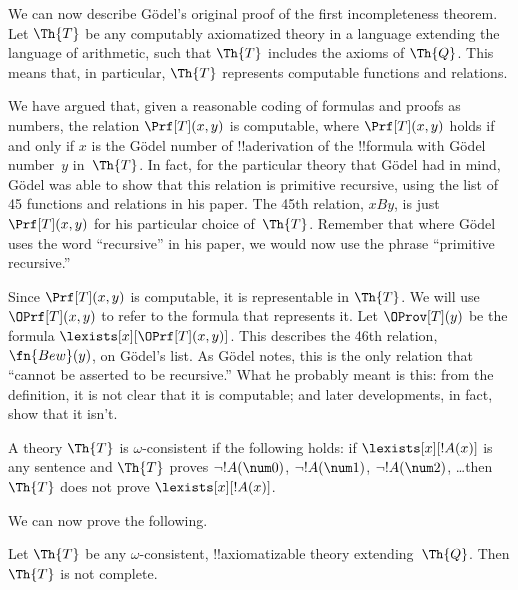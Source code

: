 \documentclass[../../../include/open-logic-section]{subfiles}
\begin{document}


We can now describe G\"odel's original proof of the first
incompleteness theorem. Let $\Th{T}$ be any computably axiomatized theory
in a language extending the language of arithmetic, such that $\Th{T}$
includes the axioms of $\Th{Q}$. This means that, in particular, $\Th{T}$
represents computable functions and relations.

We have argued that, given a reasonable coding of formulas and proofs
as numbers, the relation $\Prf[T](x,y)$ is computable, where
$\Prf[T](x,y)$ holds if and only if $x$ is the G\"odel number of
!!a{derivation} of the !!{formula} with G\"odel number~$y$
in~$\Th{T}$. In fact, for the particular theory that G\"odel had in
mind, G\"odel was able to show that this relation is primitive
recursive, using the list of 45 functions and relations in his
paper. The 45th relation, $x B y$, is just $\Prf[T](x,y)$ for his
particular choice of~$\Th{T}$. Remember that where G\"odel uses the
word ``recursive'' in his paper, we would now use the phrase
``primitive recursive.''

Since $\Prf[T](x,y)$ is computable, it is representable in $\Th{T}$. We
will use $\OPrf[T](x,y)$ to refer to the formula that represents
it. Let $\OProv[T](y)$ be the formula
$\lexists[x][\OPrf[T](x,y)]$. This describes the 46th relation,
$\fn{Bew}(y)$, on G\"odel's list. As G\"odel notes, this is the only
relation that ``cannot be asserted to be recursive.''  What he
probably meant is this: from the definition, it is not clear that it
is computable; and later developments, in fact, show that it isn't.

\begin{defn}
A theory $\Th{T}$ is $\omega$-consistent if the following holds: if
$\lexists[x][!A(x)]$ is any sentence and $\Th{T}$ proves $\lnot
!A(\num 0)$, $\lnot !A(\num 1)$, $\lnot !A(\num 2)$, \dots then $\Th{T}$
does not prove $\lexists[x][!A(x)]$.
\end{defn}

We can now prove the following.
\begin{thm}
 Let $\Th{T}$ be any
$\omega$-consistent, !!{axiomatizable} theory extending~$\Th{Q}$. Then
$\Th{T}$ is not complete.
\end{thm}
\end{document}
